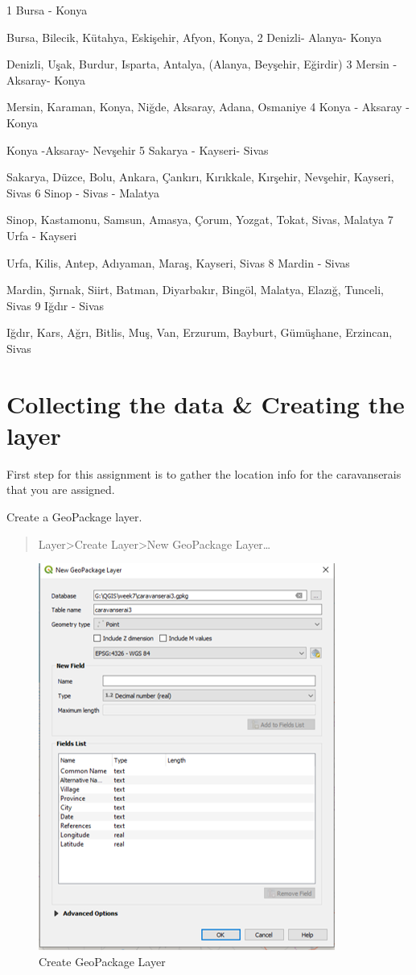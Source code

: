 \documentclass[
]{book}
\begin{document}
1
Bursa - Konya

Bursa, Bilecik, Kütahya, Eskişehir, Afyon, Konya,
2
Denizli- Alanya- Konya

Denizli, Uşak, Burdur, Isparta, Antalya, (Alanya, Beyşehir, Eğirdir)
3
Mersin - Aksaray- Konya

Mersin, Karaman, Konya, Niğde, Aksaray, Adana, Osmaniye
4
Konya - Aksaray - Konya

Konya -Aksaray- Nevşehir
5
Sakarya - Kayseri- Sivas

Sakarya, Düzce, Bolu, Ankara, Çankırı, Kırıkkale, Kırşehir, Nevşehir, Kayseri, Sivas
6
Sinop - Sivas - Malatya

Sinop, Kastamonu, Samsun, Amasya, Çorum, Yozgat, Tokat, Sivas, Malatya
7
Urfa - Kayseri

Urfa, Kilis, Antep, Adıyaman, Maraş, Kayseri, Sivas
8
Mardin - Sivas

Mardin, Şırnak, Siirt, Batman, Diyarbakır, Bingöl, Malatya, Elazığ, Tunceli, Sivas
9
Iğdır - Sivas

Iğdır, Kars, Ağrı, Bitlis, Muş, Van, Erzurum, Bayburt, Gümüşhane, Erzincan, Sivas

\hypertarget{collecting-the-data-creating-the-layer}{%
\section{Collecting the data \& Creating the layer}\label{collecting-the-data-creating-the-layer}}

First step for this assignment is to gather the location info for the caravanserais that you are assigned.

Create a GeoPackage layer.

\begin{quote}
Layer\textgreater Create Layer\textgreater New GeoPackage Layer\ldots{}
\end{quote}

\begin{figure}
\centering
\includegraphics{Images/geopackage.png}
\caption{Create GeoPackage Layer}
\end{figure}
\end{document}
